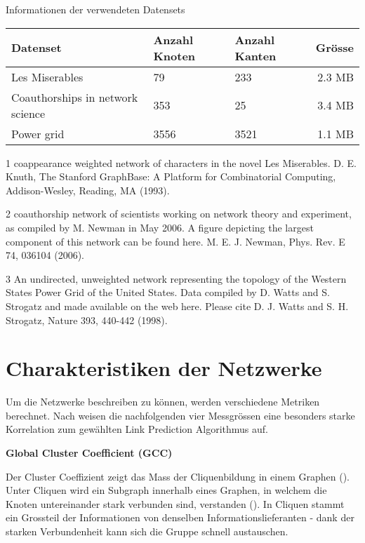 \begin{threeparttable}
    \centering
    \label{dataset_info}
    \caption{Informationen der verwendeten Datensets}
    \begin{tabular}{@{}lllr@{}}
        \toprule
        Datenset                        & Anzahl Knoten & Anzahl Kanten & Grösse \\ \midrule
        Les Miserables\tnote{1}                 & 79     & 233 & 2.3 MB   \\
        Coauthorships in network science\tnote{2} & 353    & 25 & 3.4 MB     \\
        Power grid\tnote{3}                       & 3556   & 3521 & 1.1 MB   \\ \bottomrule
    \end{tabular}
    \begin{tablenotes}[\flushleft]
        \footnotesize
        \item[1] coappearance weighted network of characters in the novel Les Miserables. D. E. Knuth, The Stanford GraphBase: A Platform for Combinatorial Computing, Addison-Wesley, Reading, MA (1993).
        \item[2] coauthorship network of scientists working on network theory and experiment, as compiled by M. Newman in May 2006. A figure depicting the largest component of this network can be found here. M. E. J. Newman, Phys. Rev. E 74, 036104 (2006).
        \item[3] An undirected, unweighted network representing the topology of the Western States Power Grid of the United States. Data compiled by D. Watts and S. Strogatz and made available on the web here. Please cite D. J. Watts and S. H. Strogatz, Nature 393, 440-442 (1998).
    \end{tablenotes}
\end{threeparttable}

\section{Charakteristiken der Netzwerke}
Um die Netzwerke beschreiben zu können, werden verschiedene Metriken berechnet.
Nach \citeauthor{gao_link_2015} weisen die nachfolgenden vier Messgrössen eine besonders starke Korrelation zum gewählten Link Prediction Algorithmus auf.

\textbf{Global Cluster Coefficient (GCC)}

Der Cluster Coeffizient zeigt das Mass der Cliquenbildung in einem Graphen (\cite{michael_henninger_soziale_2018}).
Unter Cliquen wird ein Subgraph innerhalb eines Graphen, in welchem die Knoten untereinander stark verbunden sind, verstanden (\cite{michael_henninger_soziale_2018}).
In Cliquen stammt ein Grossteil der Informationen von denselben Informationslieferanten - dank der starken Verbundenheit kann sich die Gruppe schnell austauschen.

